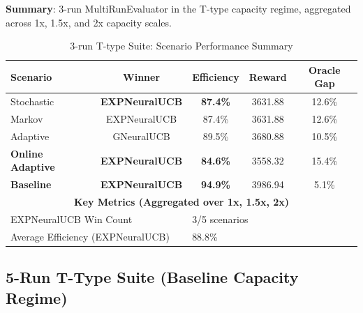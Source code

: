 \documentclass[11pt,a4paper]{article}
\newcommand{\stochastic}[1]{\textcolor{stochasticcolor}{\textbf{#1}}}
\newcommand{\success}[1]{\textcolor{successcolor}{\textbf{#1}}}
\begin{document}
\begin{tcolorbox}[colback=performancecolor!10,colframe=performancecolor]

\textbf{Summary}: 3-run MultiRunEvaluator in the T-type capacity regime, aggregated across 1x, 1.5x, and 2x capacity scales.

\begin{table}[H]
\centering
\caption{3-run T-type Suite: Scenario Performance Summary}
\begin{tabular}{|l|c|c|c|c|}
\hline
\textbf{Scenario} & \textbf{Winner} & \textbf{Efficiency} & \textbf{Reward} & \textbf{Oracle Gap} \\
\hline
\hline
Stochastic      & \stochastic{EXPNeuralUCB} & \stochastic{87.4\%} & 3631.88 & 12.6\% \\
Markov          & EXPNeuralUCB              & 87.4\%              & 3631.88 & 12.6\% \\
Adaptive        & GNeuralUCB                & 89.5\%              & 3680.88 & 10.5\% \\
\success{Online Adaptive} & \success{EXPNeuralUCB} & \success{84.6\%} & 3558.32 & 15.4\% \\
\success{Baseline}        & \success{EXPNeuralUCB} & \success{94.9\%} & 3986.94 & 5.1\% \\
\hline
\multicolumn{5}{|c|}{\textbf{Key Metrics (Aggregated over 1x, 1.5x, 2x)}} \\
\hline
\multicolumn{2}{|l|}{EXPNeuralUCB Win Count} & \multicolumn{3}{|l|}{3/5 scenarios} \\
\multicolumn{2}{|l|}{Average Efficiency (EXPNeuralUCB)} & \multicolumn{3}{|l|}{88.8\%} \\
\hline
\end{tabular}
\end{table}

\end{tcolorbox}

\subsection{5-Run T-Type Suite (Baseline Capacity Regime)}
\end{document}
